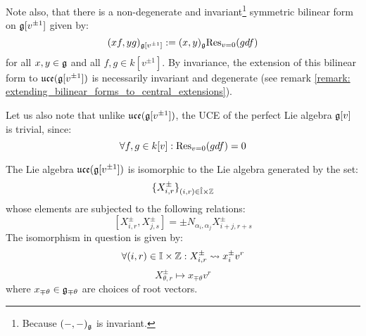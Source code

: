 \begin{example}
            Note also, that there is a non-degenerate and invariant\footnote{Because $(-, -)_{\mathfrak{g}}$ is invariant.} symmetric bilinear form on $\mathfrak{g}[v^{\pm 1}]$ given by:
                $$(xf, yg)_{\mathfrak{g}[v^{\pm 1}]} := (x, y)_{\mathfrak{g}} \mathrm{Res}_{v = 0}(g df)$$
            for all $x, y \in \mathfrak{g}$ and all $f, g \in k[v^{\pm 1}]$. By invariance, the extension of this bilinear form to $\mathfrak{uce}(\mathfrak{g}[v^{\pm 1}])$ is necessarily invariant and degenerate (see remark \ref{remark: extending_bilinear_forms_to_central_extensions}).

            Let us also note that unlike $\mathfrak{uce}(\mathfrak{g}[v^{\pm 1}])$, the UCE of the perfect Lie algebra $\mathfrak{g}[v]$ is trivial, since:
                $$\forall f, g \in k[v]: \mathrm{Res}_{v = 0}(g df) = 0$$
        \end{example}

        \begin{lemma} \label{lemma: root_grading_for_affine_lie_algebras}
            The Lie algebra $\mathfrak{uce}(\mathfrak{g}[v^{\pm 1}])$ is isomorphic to the Lie algebra generated by the set:
                $$\{ X_{i, r}^{\pm} \}_{(i, r) \in \hat{\simpleroots} \x \Z}$$
            whose elements are subjected to the following relations:
                $$[X_{i, r}^{\pm}, X_{j, s}^{\pm}] = \pm N_{\alpha_i, \alpha_j} X_{i + j, r + s}^{\pm}$$
            The isomorphism in question is given by:
                $$\forall (i, r) \in \simpleroots \x \Z: X_{i, r}^{\pm} \mapsto x_i^{\pm} v^r$$
                $$X_{\theta, r}^{\pm} \mapsto x_{\mp \theta} v^r$$
            where $x_{\mp \theta} \in \mathfrak{g}_{\mp \theta}$ are choices of root vectors.
        \end{lemma}

